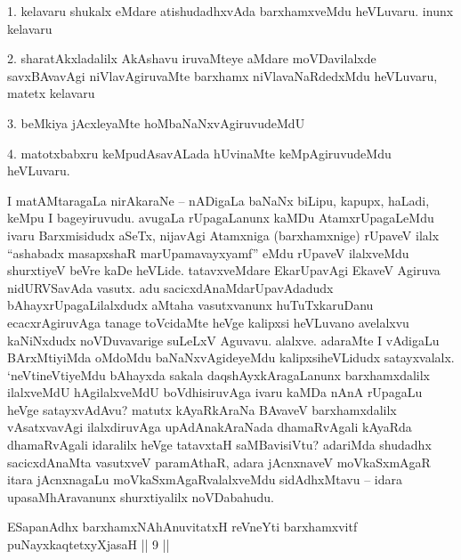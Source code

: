 \begin{artha}
1. kelavaru shukalx eMdare atishudadhxvAda barxhamxveMdu heVLuvaru. inunx kelavaru

2. sharatAkxladalilx AkAshavu iruvaMteye aMdare moVDavilalxde savxBAvavAgi niVlavAgiruvaMte barxhamx niVlavaNaRdedxMdu heVLuvaru, matetx kelavaru 

3. beMkiya jAcxleyaMte hoMbaNaNxvAgiruvudeMdU

4. matotxbabxru keMpudAsavALada hUvinaMte keMpAgiruvudeMdu heVLuvaru.

I matAMtaragaLa nirAkaraNe {\rm --} nADigaLa baNaNx biLipu, kapupx, haLadi, keMpu I bageyiruvudu. avugaLa rUpagaLanunx kaMDu AtamxrUpagaLeMdu ivaru Barxmisidudx aSeTx, nijavAgi Atamxniga (barxhamxnige) rUpaveV ilalx ``ashabadx masapxshaR marUpamavayxyamf'' eMdu rUpaveV ilalxveMdu shurxtiyeV beVre kaDe heVLide. tatavxveMdare EkarUpavAgi EkaveV Agiruva nidURVSavAda vasutx. adu sacicxdAnaMdarUpavAdadudx bAhayxrUpagaLilalxdudx aMtaha vasutxvanunx huTuTxkaruDanu ecacxrAgiruvAga tanage toVcidaMte heVge kalipxsi heVLuvano avelalxvu kaNiNxdudx noVDuvavarige suLeLxV Aguvavu. alalxve. adaraMte I vAdigaLu BArxMtiyiMda oMdoMdu baNaNxvAgideyeMdu kalipxsiheVLidudx satayxvalalx. `neVtineVtiyeMdu bAhayxda sakala daqshAyxkAragaLanunx barxhamxdalilx ilalxveMdU hAgilalxveMdU boVdhisiruvAga ivaru kaMDa nAnA rUpagaLu heVge satayxvAdAvu? matutx kAyaRkAraNa BAvaveV barxhamxdalilx vAsatxvavAgi ilalxdiruvAga upAdAnakAraNada dhamaRvAgali kAyaRda dhamaRvAgali idaralilx heVge tatavxtaH saMBavisiVtu? adariMda shudadhx sacicxdAnaMta vasutxveV paramAthaR, adara jAcnxnaveV moVkaSxmAgaR itara jAcnxnagaLu moVkaSxmAgaRvalalxveMdu sidAdhxMtavu {\rm --} idara upasaMhAravanunx shurxtiyalilx noVDabahudu.
\end{artha}

\begin{shl}
ESapanAdhx barxhamxNAhAnuvitatxH reVneYti barxhamxvitf puNayxkaqtetxyXjasaH || 9 ||
\end{shl}

